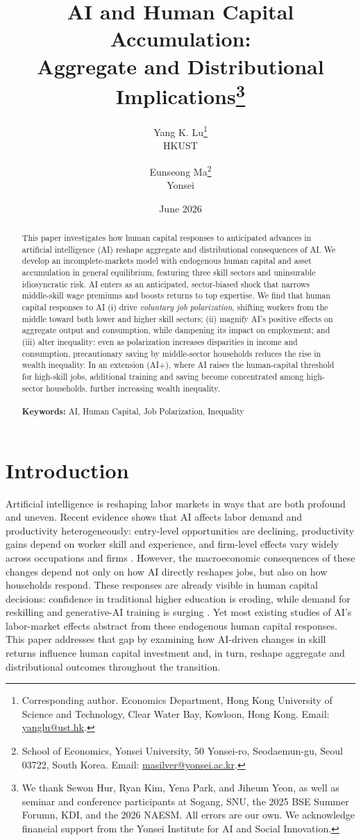 \documentclass[12pt,english]{article}
\title{\LARGE \textbf{AI and Human Capital Accumulation:\\ Aggregate and Distributional Implications}\thanks{We thank Sewon Hur, Ryan Kim, Yena Park, and Jiheum Yeon, as well as seminar and conference participants at Sogang, SNU, the 2025 BSE Summer Forumn, KDI, and the 2026 NAESM. All errors are our own. We acknowledge financial support from the Yonsei Institute for AI and Social Innovation.}\\[1.0cm]}
\author{Yang K. Lu\thanks{Corresponding author. Economics Department, Hong Kong University of Science and Technology, Clear Water Bay, Kowloon, Hong Kong. Email: \protect\href{mailto:yanglu@ust.hk}{yanglu@ust.hk}.} \\
	HKUST \and Eunseong Ma\thanks{School of Economics, Yonsei University, 50 Yonsei-ro, Seodaemun-gu, Seoul 03722, South Korea. Email: \protect\href{mailto:masilver@yonsei.ac.kr}{masilver@yonsei.ac.kr}.} \\
	Yonsei\\[0.5cm]
}
\date{June 2026}
\numberwithin{equation}{section}
\begin{document}
\maketitle


\begin{abstract}
This paper investigates how human capital responses to anticipated advances in artificial intelligence (AI) reshape aggregate and distributional consequences of AI. We develop an incomplete-markets model with endogenous human capital and asset accumulation in general equilibrium, featuring three skill sectors and uninsurable idiosyncratic risk. AI enters as an anticipated, sector-biased shock that narrows middle-skill wage premiums and boosts returns to top expertise. We find that human capital responses to AI (i) drive \textit{voluntary job polarization}, shifting workers from the middle toward both lower and higher skill sectors; (ii) magnify AI’s positive effects on aggregate output and consumption, while dampening its impact on employment; and (iii) alter inequality: even as polarization increases disparities in income and consumption, precautionary saving by middle-sector households reduces the rise in wealth inequality. In an extension (AI+), where AI raises the human-capital threshold for high-skill jobs, additional training and saving become concentrated among high-sector households, further increasing wealth inequality.\\
\\
\textbf{Keywords:} AI, Human Capital, Job Polarization, Inequality
\end{abstract}
\linenumbers

\newpage

\section{Introduction}
\label{sec:introduction}

Artificial intelligence is reshaping labor markets in ways that are both profound and uneven. Recent evidence shows that AI affects labor demand and productivity heterogeneously: entry-level opportunities are declining, productivity gains depend on worker skill and experience, and firm-level effects vary widely across occupations and firms \cite{reveliolabs2025,calvino_effects_2025,de_souza_artificial_2025,asam_generative_2025}. However, the macroeconomic consequences of these changes depend not only on how AI directly reshapes jobs, but also on how households respond. These responses are already visible in human capital decisions: confidence in traditional higher education is eroding, while demand for reskilling and generative-AI training is surging \cite{hesa2022,pew2024,publicagenda2022,oliwyman2024}. Yet most existing studies of AI’s labor-market effects abstract from these endogenous human capital responses. This paper addresses that gap by examining how AI-driven changes in skill returns influence human capital investment and, in turn, reshape aggregate and distributional outcomes throughout the transition.
\end{document}
